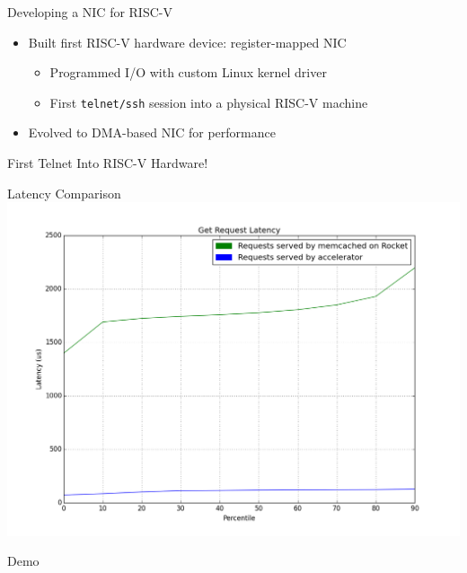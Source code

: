 \documentclass{beamer}
\begin{document}
\begin{frame}
    
\end{frame}

\begin{frame}{Developing a NIC for RISC-V}
    \begin{itemize}
\item Built first RISC-V hardware device: register-mapped NIC
	\begin{itemize}
	\footnotesize
	\item Programmed I/O with custom Linux kernel driver
	\item First \texttt{telnet/ssh} session into a physical RISC-V machine
	\end{itemize}
\item Evolved to DMA-based NIC for performance
\end{itemize}
\end{frame}

\begin{frame}{First Telnet Into RISC-V Hardware!}
\end{frame}






\begin{frame}{Latency Comparison}
    \includegraphics[width=\linewidth]{../img/graph.png}
\end{frame}

\begin{frame}
    Demo
\end{frame}
\end{document}
